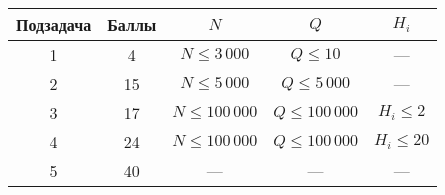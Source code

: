 \newcommand{\gt}{\textgreater} 
\newcommand{\lt}{\textless} 


\begin{center}
\renewcommand{\arraystretch}{1.5}
\begin{tabular}{|c|c|c|c|c|}
\hline
Подзадача & Баллы & $N$ & $Q$ & $H_i$ \\
\hline
1 & 4 & $N \le 3\,000$ & $Q\le 10$ & --- \\
\hline
2 & 15 & $N \le 5\,000$ & $Q\le 5\,000$ & --- \\
\hline
3 & 17 & $N \le 100\,000$ & $Q\le 100\,000$ & $H_i \le 2$ \\
\hline
4 & 24 & $N \le 100\,000$ & $Q\le 100\,000$ & $H_i \le 20$ \\
\hline
5 & 40 & --- & --- & --- \\
\hline
\end{tabular}
\end{center}


